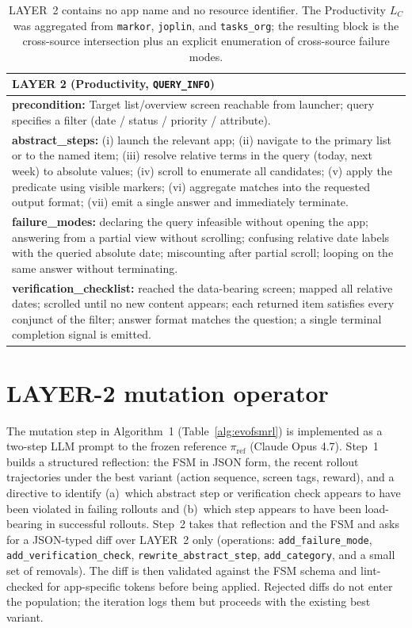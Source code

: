 \begin{table}[t]
\small
\begin{tabular}{p{}}
\hline
\textbf{LAYER 2 (Productivity, \texttt{QUERY\_INFO})} \\
\hline
\textbf{precondition:} Target list/overview screen reachable from launcher; query specifies a filter (date / status / priority / attribute). \\
\textbf{abstract\_steps:} (i) launch the relevant app; (ii) navigate to the primary list or to the named item; (iii) resolve relative terms in the query (today, next week) to absolute values; (iv) scroll to enumerate all candidates; (v) apply the predicate using visible markers; (vi) aggregate matches into the requested output format; (vii) emit a single answer and immediately terminate. \\
\textbf{failure\_modes:} declaring the query infeasible without opening the app; answering from a partial view without scrolling; confusing relative date labels with the queried absolute date; miscounting after partial scroll; looping on the same answer without terminating. \\
\textbf{verification\_checklist:} reached the data-bearing screen; mapped all relative dates; scrolled until no new content appears; each returned item satisfies every conjunct of the filter; answer format matches the question; a single terminal completion signal is emitted. \\
\hline
\end{tabular}
\caption{LAYER~2 contains no app name and no resource identifier. The Productivity $L_C$ was aggregated from \texttt{markor}, \texttt{joplin}, and \texttt{tasks\_org}; the resulting block is the cross-source intersection plus an explicit enumeration of cross-source failure modes.}
\label{fig:layer2}
\end{table}

\section{LAYER-2 mutation operator}
\label{app:mutation}

The mutation step in Algorithm~1 (Table~\ref{alg:evofsmrl}) is implemented as a two-step LLM prompt to the frozen reference $\pi_{\text{ref}}$ (Claude Opus 4.7). Step~1 builds a structured reflection: the FSM in JSON form, the recent rollout trajectories under the best variant (action sequence, screen tags, reward), and a directive to identify (a)~which abstract step or verification check appears to have been violated in failing rollouts and (b)~which step appears to have been load-bearing in successful rollouts. Step~2 takes that reflection and the FSM and asks for a JSON-typed diff over LAYER~2 only (operations: \texttt{add\_failure\_mode}, \texttt{add\_verification\_check}, \texttt{rewrite\_abstract\_step}, \texttt{add\_category}, and a small set of removals). The diff is then validated against the FSM schema and lint-checked for app-specific tokens before being applied. Rejected diffs do not enter the population; the iteration logs them but proceeds with the existing best variant.

